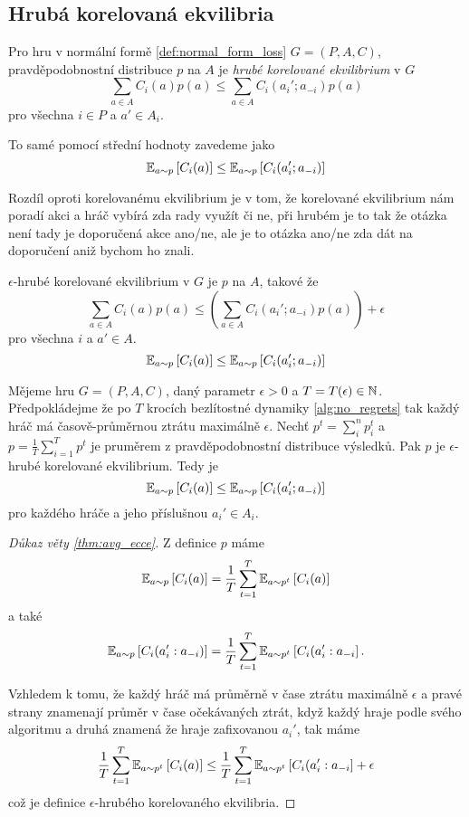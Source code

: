 \subsection{Hrubá korelovaná ekvilibria}
\begin{definition}
\label{def:cce}
Pro hru v normální formě \ref{def:normal_form_loss} $G= (P,A,C)$, pravděpodobnostní distribuce $p$ na $A$ je \textit{hrubé korelované ekvilibrium} v $G$ 
\[
    \sum_{a \in A} C_i(a)p(a) \leq \sum_{a \in A} C_i(a_i';a_{-i}) p(a)
\]
pro všechna $i \in P$ a $a'\in A_i$. 

To samé pomocí střední hodnoty zavedeme jako 
\[
    \E[a \sim p]{C_i(a)} \leq \E[a\sim p]{C_i(a_i';a_{-i})}
\]
\end{definition}
Rozdíl oproti korelovanému ekvilibrium je v tom, že korelované ekvilibrium nám poradí akci a hráč vybírá zda rady využít či ne, při hrubém je to tak že otázka není tady je doporučená akce ano/ne, ale je to otázka ano/ne zda dát na doporučení aniž bychom ho znali. 

\begin{definition}
\label{def:e_cce}
$\epsilon$-hrubé korelované ekvilibrium v $G$ je $p$ na $A$, takové že 
\[
    \sum_{a \in A} C_i(a)p(a) \leq \left( \sum_{a \in A} C_i(a_i';a_{-i}) p(a) \right) + \epsilon 
\]
pro všechna $i$ a $a' \in A$. 
\[
    \E[a \sim p]{C_i(a)} \leq \E[a\sim p]{C_i(a_i';a_{-i})}
\]
\end{definition}

\begin{theorem}\label{thm:avg_ecce}
Mějeme hru $G=(P,A,C)$, daný parametr $\epsilon > 0$ a $T = T(\epsilon) \in \N$. Předpokládejme že po $T$ krocích bezlítostné dynamiky \ref{alg:no_regrets} tak každý hráč má časově-průměrnou ztrátu maximálně $\epsilon$. 
Nechť $p^t =\sum_i^n p^t_i$ a $p = \frac{1}{T} \sum^T_{i=1} p^t$ je pruměrem z pravděpodobnostní distribuce výsledků. Pak $p$ je $\epsilon$-hrubé korelované ekvilibrium. Tedy je  
\[
    \E[a \sim p]{C_i(a)} \leq \E[a\sim p]{C_i(a_i';a_{-i})}
\]
pro každého hráče a jeho příslušnou $a_i' \in A_i$.
\end{theorem}
\begin{proof}[Důkaz věty \ref{thm:avg_ecce}]
    Z definice $p$ máme 
    \[
        \E[a \sim p]{C_i(a)} = \frac{1}{T} \sum^T_{t=1} \E[a\sim p^t]{C_i(a)}
    \]
    a také
    \[
        \E[a \sim p]{C_i(a_i':a_{-i})} = \frac{1}{T} \sum^T_{t=1} \E[a\sim p^t]{C_i(a_i':a_{-i}}.
    \]

    Vzhledem k tomu, že každý hráč má průměrně v čase ztrátu maximálně $\epsilon$ a pravé strany znamenají průměr v čase očekávaných ztrát, když každý hraje podle svého algoritmu a druhá znamená že hraje zafixovanou $a_i'$, tak máme 
    \[
         \frac{1}{T} \sum^T_{t=1} \E[a\sim p^t]{C_i(a)} \leq \frac{1}{T} \sum^T_{t=1} \E[a\sim p^t]{C_i(a_i':a_{-i}} + \epsilon  
    \]
    což je definice $\epsilon$-hrubého korelovaného ekvilibria. 
\end{proof}
